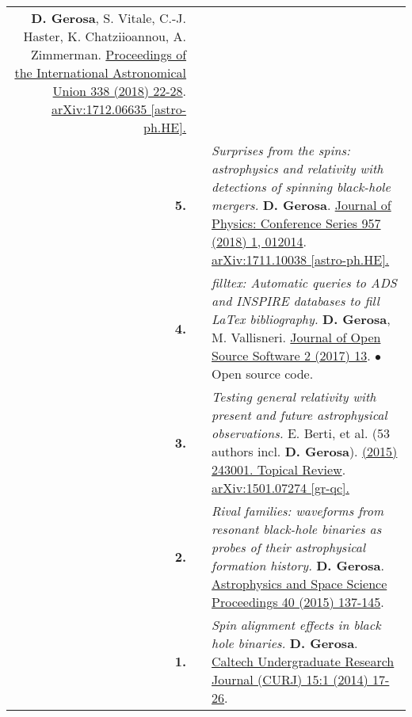 {\begin{longtable}{rp{0.3cm}p{15.8cm}}
\newline{}
\textbf{D. Gerosa}, S. Vitale, C.-J. Haster, K. Chatziioannou, A. Zimmerman.
\newline{}
\href{https://doi.org/10.1017/S1743921318003587}{Proceedings of the International Astronomical Union 338 (2018) 22-28}. \href{https://arxiv.org/abs/1712.06635}{arXiv:1712.06635 [astro-ph.HE].}
\vspace{0.09cm}\\
%
\textbf{5.} & & \textit{Surprises from the spins: astrophysics and relativity with detections of spinning black-hole mergers.}
\newline{}
\textbf{D. Gerosa}.
\newline{}
\href{http://dx.doi.org/10.1088/1742-6596/957/1/012014}{Journal of Physics: Conference Series 957 (2018) 1, 012014}. \href{https://arxiv.org/abs/1711.10038}{arXiv:1711.10038 [astro-ph.HE].}
\vspace{0.09cm}\\
%
\textbf{4.} & & \textit{filltex: Automatic queries to ADS and INSPIRE databases to fill LaTex bibliography.}
\newline{}
\textbf{D. Gerosa}, M. Vallisneri.
\newline{}
\href{http://dx.doi.org/10.21105/joss.00222}{Journal of Open Source Software 2 (2017) 13}. 
\newline{}
\textcolor{color1}{$\bullet$} Open source code.
\vspace{0.09cm}\\
%
\textbf{3.} & & \textit{Testing general relativity with present and future astrophysical observations.}
\newline{}
E. Berti, et al. (53 authors incl. \textbf{D. Gerosa}).
\newline{}
\href{http://dx.doi.org/10.1088/0264-9381/32/24/243001}{\cqg 32 (2015) 243001. Topical Review}. \href{https://arxiv.org/abs/1501.07274}{arXiv:1501.07274 [gr-qc].}
\vspace{0.09cm}\\
%
\textbf{2.} & & \textit{Rival families: waveforms from resonant black-hole binaries as probes of their astrophysical formation history.}
\newline{}
\textbf{D. Gerosa}.
\newline{}
\href{http://dx.doi.org/10.1007/978-3-319-10488-1_12}{Astrophysics and Space Science Proceedings 40 (2015) 137-145}. 
\vspace{0.09cm}\\
%
\textbf{1.} & & \textit{Spin alignment effects in black hole binaries.}
\newline{}
\textbf{D. Gerosa}.
\newline{}
\href{https://caltechcampuspubs.library.caltech.edu/2800/}{Caltech Undergraduate Research Journal (CURJ) 15:1 (2014) 17-26}. 
\vspace{0.09cm}\\
%
\end{longtable} }
